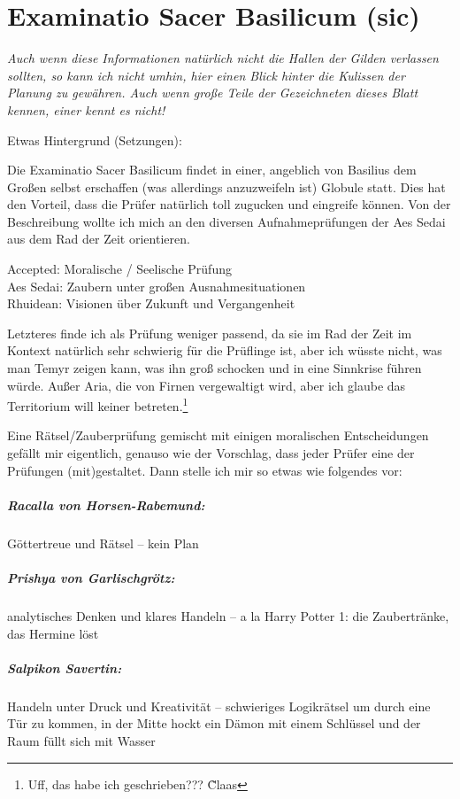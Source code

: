 \chapter{Examinatio Sacer Basilicum (sic)}

{\itshape
Auch wenn diese Informationen natürlich nicht die Hallen der Gilden verlassen sollten, so kann ich nicht umhin, hier einen Blick hinter die Kulissen der Planung zu gewähren. Auch wenn große Teile der Gezeichneten dieses Blatt kennen, einer kennt es nicht!
}

Etwas Hintergrund (Setzungen):

Die Examinatio Sacer Basilicum findet in einer, angeblich von Basilius dem Großen selbst erschaffen (was allerdings anzuzweifeln ist) Globule statt. Dies hat den Vorteil, dass die Prüfer natürlich toll zugucken und eingreife können. Von der Beschreibung wollte ich mich an den diversen Aufnahmeprüfungen der Aes Sedai aus dem Rad der Zeit orientieren.

Accepted: 	Moralische / Seelische Prüfung\\
Aes Sedai:	Zaubern unter großen Ausnahmesituationen\\
Rhuidean:	Visionen über Zukunft und Vergangenheit

Letzteres finde ich als Prüfung weniger passend, da sie im Rad der Zeit im Kontext natürlich sehr schwierig für die Prüflinge ist, aber ich wüsste nicht, was man Temyr zeigen kann, was ihn groß schocken und in eine Sinnkrise führen würde. Außer Aria, die von Firnen vergewaltigt wird, aber ich glaube das Territorium will keiner betreten.\footnote{Uff, das habe ich geschrieben??? \~ Claas}

Eine Rätsel/Zauberprüfung gemischt mit einigen moralischen Entscheidungen gefällt mir eigentlich, genauso wie der Vorschlag, dass jeder Prüfer eine der Prüfungen (mit)gestaltet. Dann stelle ich mir so etwas wie folgendes vor:

\paragraph{Racalla von Horsen-Rabemund:} Göttertreue und Rätsel -- kein Plan
\paragraph{Prishya von Garlischgrötz:} analytisches Denken und klares Handeln -- a la Harry Potter 1: die Zaubertränke, das Hermine löst
\paragraph{Salpikon Savertin:} Handeln unter Druck und Kreativität -- schwieriges Logikrätsel um durch eine Tür zu kommen, in der Mitte hockt ein Dämon mit einem Schlüssel und der Raum füllt sich mit Wasser
